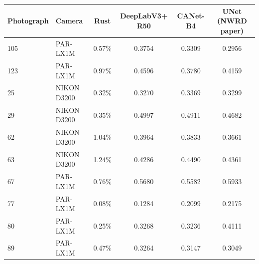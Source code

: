 \begin{tabular}{llcccc}
\toprule
Photograph & Camera & Rust & DeepLabV3+ R50 & CANet-B4 & UNet (NWRD paper) \\
\midrule
105 & PAR-LX1M & 0.57\% & 0.3754 & 0.3309 & 0.2956 \\
123 & PAR-LX1M & 0.97\% & 0.4596 & 0.3780 & 0.4159 \\
25 & NIKON D3200 & 0.32\% & 0.3270 & 0.3369 & 0.3299 \\
29 & NIKON D3200 & 0.35\% & 0.4997 & 0.4911 & 0.4682 \\
62 & NIKON D3200 & 1.04\% & 0.3964 & 0.3833 & 0.3661 \\
63 & NIKON D3200 & 1.24\% & 0.4286 & 0.4490 & 0.4361 \\
67 & PAR-LX1M & 0.76\% & 0.5680 & 0.5582 & 0.5933 \\
77 & PAR-LX1M & 0.08\% & 0.1284 & 0.2099 & 0.2175 \\
80 & PAR-LX1M & 0.25\% & 0.3268 & 0.3236 & 0.4111 \\
89 & PAR-LX1M & 0.47\% & 0.3264 & 0.3147 & 0.3049 \\
\bottomrule
\end{tabular}
